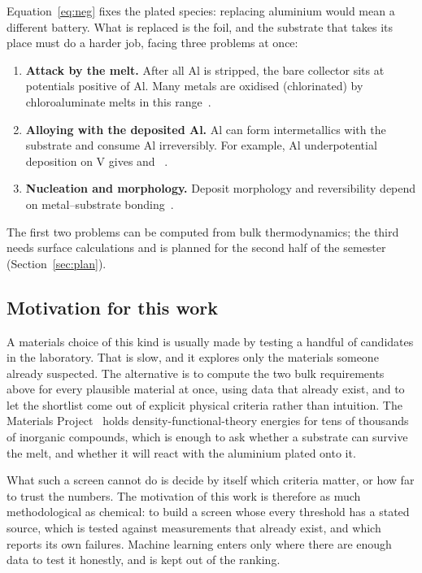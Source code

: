 Equation~\eqref{eq:neg} fixes the plated species: replacing aluminium would mean a different battery. What is replaced is the foil, and the substrate that takes its place must do a harder job, facing three problems at once:
\begin{enumerate}[leftmargin=*]
\item \textbf{Attack by the melt.} After all Al is stripped, the bare collector sits at potentials positive of Al. Many metals are oxidised (chlorinated) by chloroaluminate melts in this range~\citep{Wang2018,Oh2018,Reed2013}.
\item \textbf{Alloying with the deposited Al.} Al can form intermetallics with the substrate and consume Al irreversibly. For example, Al underpotential deposition on V gives  and ~\citep{Cvetkovic2021}.
\item \textbf{Nucleation and morphology.} Deposit morphology and reversibility depend on metal--substrate bonding~\citep{Zheng2021}.
\end{enumerate}
The first two problems can be computed from bulk thermodynamics; the third needs surface calculations and is planned for the second half of the semester (Section~\ref{sec:plan}).

\subsection{Motivation for this work}
A materials choice of this kind is usually made by testing a handful of candidates in the laboratory. That is slow, and it explores only the materials someone already suspected. The alternative is to compute the two bulk requirements above for every plausible material at once, using data that already exist, and to let the shortlist come out of explicit physical criteria rather than intuition. The Materials Project~\citep{Jain2013} holds density-functional-theory energies for tens of thousands of inorganic compounds, which is enough to ask whether a substrate can survive the melt, and whether it will react with the aluminium plated onto it.

What such a screen cannot do is decide by itself which criteria matter, or how far to trust the numbers. The motivation of this work is therefore as much methodological as chemical: to build a screen whose every threshold has a stated source, which is tested against measurements that already exist, and which reports its own failures. Machine learning enters only where there are enough data to test it honestly, and is kept out of the ranking.

